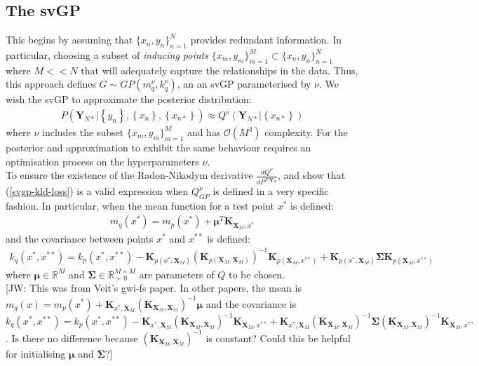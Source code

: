 \documentclass{article}
\newcommand{\jw}[1]{{\color{gray} [JW: #1]}}
\numberwithin{equation}{section}
\begin{document}
\subsection{The svGP}
This begins by assuming that $\{x_n, y_n\}_{n=1}^{N}$ provides redundant information. In particular, choosing a subset of \textit{inducing points} $\{x_m, y_m\}_{m=1}^{M} \subset \{x_n, y_n\}_{n=1}^{N}$ where $M << N$ that will adequately capture the relationships in the data. Thus, this approach defines $G \sim GP(m_q^\nu, k_q^\nu)$, an an svGP  parameterised by $\nu$. We wish the svGP to approximate the posterior distribution:
\begin{align}
    P\left(\mathbf{Y}_{N*} \Big\vert \left\{ y_n\right\},  \left\{ x_n\right\},  \left\{ x_{n*}\right\}\right) \approx Q^\nu\left(\mathbf{Y}_{N*} \Big\vert \left\{ x_{n*}\right\}\right)
\end{align}
where $\nu$ includes the subset $\{x_m, y_m\}_{m=1}^{M}$ and has $\mathcal{O}(M^3)$ complexity. For the posterior and approximation to exhibit the same behaviour requires an optimisation process on the hyperparameters $\nu$.
\\To ensure the existence of the Radon-Nikodym derivative $\frac{dQ^{\nu}}{d P^{F \vert \mathbf{Y}_N}}$, \cite{matthews2016sparse} and \cite{titsias2009variational} show that (\ref{svgp-kld-loss}) is a valid expression when $Q_{GP}^{\nu}$ is defined in a very specific fashion. In particular, when the mean function for a test point $x^*$ is defined:
\begin{align}
    m_q(x^*) = m_p(x^*) + \mathbf{\mu}^T\mathbf{K}_{\mathbf{X}_M, x^*}
    \label{svgp-mean}
\end{align}
and the covariance between points $x^*$ and $x^{**}$ is defined:
\begin{align}
        k_q(x^*, x^{**}) = k_p(x^*, x^{**}) - \mathbf{K}_{p(x^*, \mathbf{X}_M)} \left(\mathbf{K}_{p(\mathbf{X}_M, \mathbf{X}_M)}\right)^{-1}\mathbf{K}_{p(\mathbf{X}_M, x^{**})} + \mathbf{K}_{p(x^*, \mathbf{X}_M)} \mathbf{\Sigma}\mathbf{K}_{p(\mathbf{X}_M, x^{**})}
    \label{svgp-covariance}
\end{align}
where $\mathbf{\mu} \in \mathbb{R}^{M}$ and $\mathbf{\Sigma} \in \mathbb{R}^{M\times M}_{\succ 0}$ are parameters of $Q$ to be chosen.
\\\jw{This was from Veit's gwi-fs paper. In other papers, the mean is $m_q(x) =  m_p(x^*) + \mathbf{K}_{x^*, \mathbf{X}_M} \left(\mathbf{K}_{\mathbf{X}_M, \mathbf{X}_M}\right)^{-1} \mathbf{\mu}$ and the covariance is $k_q(x^*, x^{**}) = k_p(x^*, x^{**}) - \mathbf{K}_{x^*, \mathbf{X}_M} \left(\mathbf{K}_{\mathbf{X}_M, \mathbf{X}_M}\right)^{-1}\mathbf{K}_{\mathbf{X}_M, x^{**}} + \mathbf{K}_{x^*, \mathbf{X}_M} \left(\mathbf{K}_{\mathbf{X}_M, \mathbf{X}_M}\right)^{-1} \mathbf{\Sigma}\left(\mathbf{K}_{\mathbf{X}_M, \mathbf{X}_M}\right)^{-1}\mathbf{K}_{\mathbf{X}_M, x^{**}}$. Is there no difference because $\left(\mathbf{K}_{\mathbf{X}_M, \mathbf{X}_M}\right)^{-1}$ is constant? Could this be helpful for initialising $\mathbf{\mu}$ and $\mathbf{\Sigma}$?}
\end{document}
